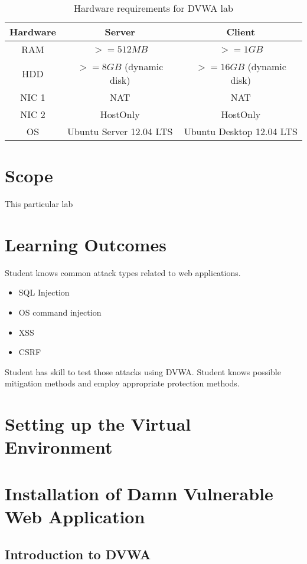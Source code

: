 \begin{table}
\centering
\caption{Hardware requirements for DVWA lab}
\begin{tabular}{|c|c|c|}
\hline 
\rule[-1ex]{0pt}{2.5ex} Hardware & Server & Client \\ 
\hline 
\rule[-1ex]{0pt}{2.5ex} RAM & $>=512MB$ & $>=1GB$\\ 
\hline
\rule[-1ex]{0pt}{2.5ex} HDD & $>=8GB$ (dynamic disk) & $>=16GB$ (dynamic disk)\\ 
\hline 
\rule[-1ex]{0pt}{2.5ex} NIC 1 & NAT  & NAT \\ 
\hline 
\rule[-1ex]{0pt}{2.5ex} NIC 2 & HostOnly & HostOnly \\ 
\hline 
\rule[-1ex]{0pt}{2.5ex} OS & Ubuntu Server 12.04 LTS & Ubuntu Desktop 12.04 LTS\\ 
\hline 
\end{tabular}
\label{table:HW for DVWA}
\end{table}


\section{Scope}
This particular lab 
\section{Learning Outcomes}
Student knows common attack types related to web applications.
\begin{itemize}
	\item SQL Injection
	\item OS command injection
	\item  \gls{XSS}
	\item  \gls{CSRF}
\end{itemize} Student has skill to test those attacks using \gls{DVWA}.
Student knows possible mitigation methods and employ appropriate protection methods.
\section{Setting up the Virtual Environment}
\section{Installation of Damn Vulnerable Web Application}
\subsection{Introduction to DVWA}

